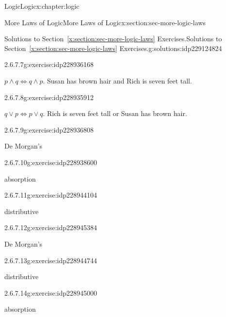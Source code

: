 \documentclass[twoside,10pt,]{book}
\newcommand{\xreffont}{\relax}
\numberwithin{equation}{section}
\begin{document}
\begin{chapterptx}{Logic}{}{Logic}{}{}{x:chapter:logic}
\begin{sectionptx}{More Laws of Logic}{}{More Laws of Logic}{}{}{x:section:sec-more-logic-laws}
\begin{solutions-subsection}{Solutions to Section~{\xreffont\ref*{x:section:sec-more-logic-laws}} Exercises.}{}{Solutions to Section~{\xreffont\ref*{x:section:sec-more-logic-laws}} Exercises.}{}{}{g:solutions:idp229124824}
\begin{exercisegroup}
\begin{divisionsolutioneg}{2.6.7.7}{}{g:exercise:idp228936168}%
\par\smallskip%
\noindent\hypertarget{g:solution:idp228939240-main}{}\(p {\wedge}{} q  {\Leftrightarrow}{}  q {\wedge}{} p\).  Susan has brown hair and Rich is seven feet tall.\end{divisionsolutioneg}%
\begin{divisionsolutioneg}{2.6.7.8}{}{g:exercise:idp228935912}%
\par\smallskip%
\noindent\hypertarget{g:solution:idp228938728-main}{}\(q {\vee}{} p  {\Leftrightarrow}{}  p {\vee}{} q\).  Rich is seven feet tall or Susan has brown hair.\end{divisionsolutioneg}%
\end{exercisegroup}
\par\medskip\noindent
\begin{exercisegroup}
\begin{divisionsolutioneg}{2.6.7.9}{}{g:exercise:idp228936808}%
\par\smallskip%
\noindent\hypertarget{g:solution:idp228938344-main}{}De Morgan's\end{divisionsolutioneg}%
\begin{divisionsolutioneg}{2.6.7.10}{}{g:exercise:idp228938600}%
\par\smallskip%
\noindent\hypertarget{g:solution:idp228932328-main}{}absorption\end{divisionsolutioneg}%
\begin{divisionsolutioneg}{2.6.7.11}{}{g:exercise:idp228944104}%
\par\smallskip%
\noindent\hypertarget{g:solution:idp228946152-main}{}distributive\end{divisionsolutioneg}%
\begin{divisionsolutioneg}{2.6.7.12}{}{g:exercise:idp228945384}%
\par\smallskip%
\noindent\hypertarget{g:solution:idp228943848-main}{}De Morgan's\end{divisionsolutioneg}%
\begin{divisionsolutioneg}{2.6.7.13}{}{g:exercise:idp228944744}%
\par\smallskip%
\noindent\hypertarget{g:solution:idp228940136-main}{}distributive\end{divisionsolutioneg}%
\begin{divisionsolutioneg}{2.6.7.14}{}{g:exercise:idp228945000}%
\par\smallskip%
\noindent\hypertarget{g:solution:idp228945640-main}{}absorption\end{divisionsolutioneg}%

\end{exercisegroup}
\end{solutions-subsection}
\end{sectionptx}
\end{chapterptx}
\end{document}
